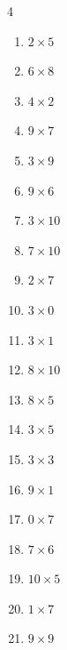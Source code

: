 \begin{multicols}{4}
\begin{enumerate}
  \item $2\times 5$
        \phantom{$=10$}

  \item $6\times 8$
        \phantom{$=48$}

  \item $4\times 2$
        \phantom{$=8$}

  \item $9\times 7$
        \phantom{$=63$}

  \item $3\times 9$
        \phantom{$=27$}

  \item $9\times 6$
        \phantom{$=54$}

  \item $3\times 10$
        \phantom{$=30$}

  \item $7\times 10$
        \phantom{$=70$}

  \item $2\times 7$
        \phantom{$=14$}

  \item $3\times 0$
        \phantom{$=0$}

  \item $3\times 1$
        \phantom{$=3$}

  \item $8\times 10$
        \phantom{$=80$}

  \item $8\times 5$
        \phantom{$=40$}

  \item $3\times 5$
        \phantom{$=15$}

  \item $3\times 3$
        \phantom{$=9$}

  \item $9\times 1$
        \phantom{$=9$}

  \item $0\times 7$
        \phantom{$=0$}

  \item $7\times 6$
        \phantom{$=42$}

  \item $10\times 5$
        \phantom{$=50$}

  \item $1\times 7$
        \phantom{$=7$}

  \item $9\times 9$
        \phantom{$=81$}


\end{enumerate}
\end{multicols}
